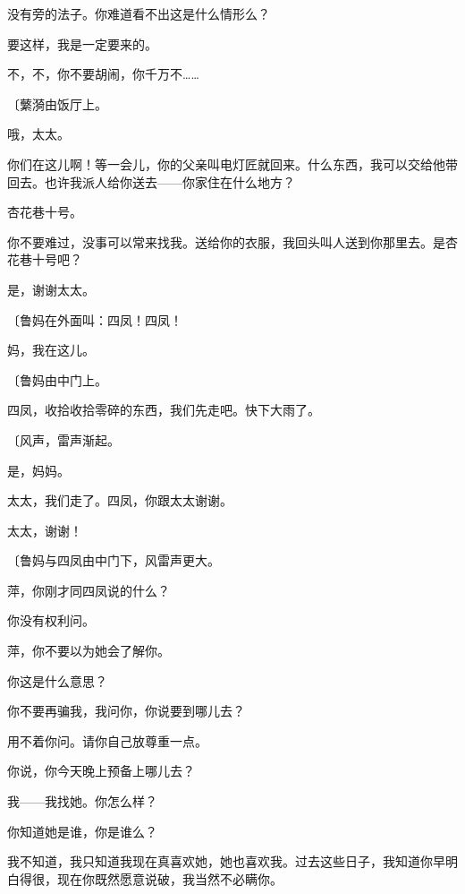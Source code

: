 没有旁的法子。你难道看不出这是什么情形么？

要这样，我是一定要来的。

不，不，你不要胡闹，你千万不……

{\fangsong〔蘩漪由饭厅上。}

哦，太太。

你们在这儿啊！等一会儿，你的父亲叫电灯匠就回来。什么东西，我可以交给他带回去。也许我派人给你送去——你家住在什么地方？

杏花巷十号。

你不要难过，没事可以常来找我。送给你的衣服，我回头叫人送到你那里去。是杏花巷十号吧？

是，谢谢太太。

{\fangsong〔鲁妈在外面叫：四凤！四凤！}

妈，我在这儿。

{\fangsong〔鲁妈由中门上。}

四凤，收拾收拾零碎的东西，我们先走吧。快下大雨了。

{\fangsong〔风声，雷声渐起。}

是，妈妈。

太太，我们走了。四凤，你跟太太谢谢。

太太，谢谢！

{\fangsong〔鲁妈与四凤由中门下，风雷声更大。}

萍，你刚才同四凤说的什么？

你没有权利问。

萍，你不要以为她会了解你。

你这是什么意思？

你不要再骗我，我问你，你说要到哪儿去？

用不着你问。请你自己放尊重一点。

你说，你今天晚上预备上哪儿去？

我——我找她。你怎么样？

你知道她是谁，你是谁么？

我不知道，我只知道我现在真喜欢她，她也喜欢我。过去这些日子，我知道你早明白得很，现在你既然愿意说破，我当然不必瞒你。

